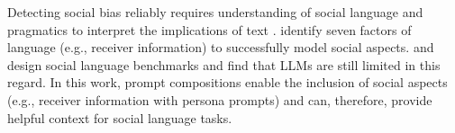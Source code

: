 
Detecting social bias reliably requires understanding of social language and pragmatics to interpret the implications of text \cite{choi2023}. \citet{hovy2021} identify seven factors of language (e.g., receiver information) to successfully model social aspects. \citet{choi2023} and \citet{zhou2023a} design social language benchmarks and find that LLMs are still limited in this regard. In this work, prompt compositions enable the inclusion of social aspects (e.g., receiver information with persona prompts) and can, therefore, provide helpful context for social language tasks.
